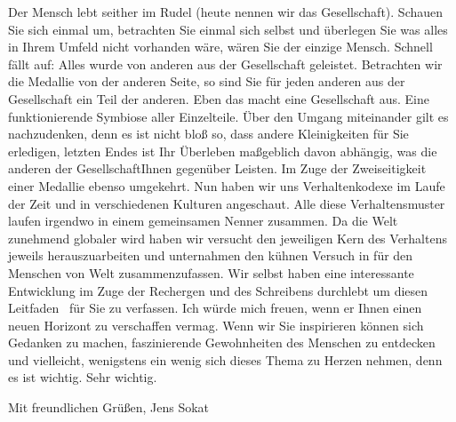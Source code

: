 Der Mensch lebt seither im Rudel (heute nennen wir das Gesellschaft). Schauen Sie sich einmal um, betrachten Sie einmal sich selbst und überlegen Sie was alles in
Ihrem Umfeld nicht vorhanden wäre, wären Sie der einzige Mensch. Schnell fällt auf: Alles wurde von anderen aus der Gesellschaft geleistet. Betrachten wir die Medallie von
der anderen Seite, so sind Sie für jeden anderen aus der Gesellschaft ein Teil der anderen. Eben das macht eine Gesellschaft aus. Eine funktionierende Symbiose aller
Einzelteile. Über den Umgang miteinander gilt es nachzudenken, denn es ist nicht bloß so, dass andere Kleinigkeiten für Sie erledigen, letzten Endes ist Ihr Überleben maßgeblich davon
abhängig, was die anderen der GesellschaftIhnen gegenüber Leisten. Im Zuge der Zweiseitigkeit einer Medallie ebenso umgekehrt.
Nun haben wir uns Verhaltenkodexe im Laufe der Zeit und in verschiedenen Kulturen angeschaut. Alle diese Verhaltensmuster laufen irgendwo in einem gemeinsamen Nenner zusammen.
Da die Welt zunehmend globaler wird haben wir versucht den jeweiligen Kern des Verhaltens jeweils herauszuarbeiten und unternahmen den kühnen Versuch in für den Menschen von Welt
zusammenzufassen. Wir selbst haben eine interessante Entwicklung im Zuge der Rechergen und des Schreibens durchlebt um diesen \glqq Leitfaden \grqq \ für Sie zu verfassen.
Ich würde mich freuen, wenn er Ihnen einen neuen Horizont zu verschaffen vermag. Wenn wir Sie inspirieren können sich Gedanken zu machen, faszinierende Gewohnheiten des Menschen zu entdecken
und vielleicht, wenigstens ein wenig sich dieses Thema zu Herzen nehmen, denn es ist wichtig. Sehr wichtig.

Mit freundlichen Grüßen,
Jens Sokat

